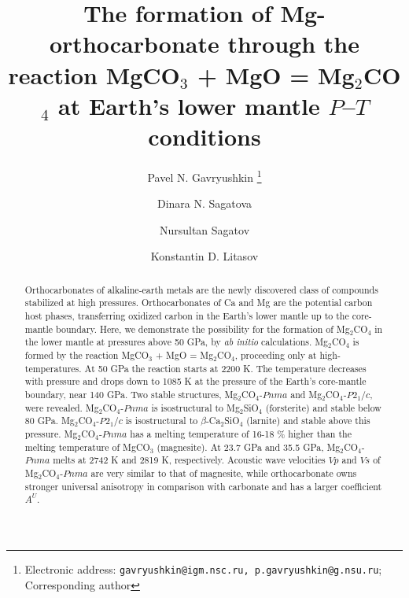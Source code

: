 \documentclass[a4paperm]{article}
\begin{document}

\title{The formation of Mg-orthocarbonate through the reaction MgCO$_3$ + MgO = Mg$_2$CO$_4$ at Earth's lower mantle $P$--$T$ conditions}


\author[1,2]{Pavel N. Gavryushkin
   \thanks{Electronic address: \texttt{gavryushkin@igm.nsc.ru, p.gavryushkin@g.nsu.ru}; Corresponding author}}     
\author[1,2]{Dinara N. Sagatova}
\author[1]{Nursultan Sagatov}
\author[3]{Konstantin D. Litasov}


\date{}
\maketitle


\begin{abstract}
Orthocarbonates of alkaline-earth metals are the newly discovered class of compounds stabilized at high pressures.
Orthocarbonates of Ca and Mg are the potential carbon host phases, transferring oxidized carbon in the Earth's lower mantle up to the core-mantle boundary.
Here, we demonstrate the possibility for the formation of Mg$_2$CO$_4$ in the lower mantle at pressures above 50 GPa, by {\it ab initio} calculations.
Mg$_2$CO$_4$ is formed by the reaction MgCO$_3$ + MgO = Mg$_2$CO$_4$, proceeding only at high-temperatures.
At 50 GPa the reaction starts at 2200 K.
The temperature decreases with pressure and drops down to 1085 K at the pressure of the Earth's core-mantle boundary, near 140 GPa.
Two stable structures, Mg$_2$CO$_4$-$Pnma$ and Mg$_2$CO$_4$-$P2_1/c$, were revealed. 
Mg$_2$CO$_4$-$Pnma$ is isostructural to Mg$_2$SiO$_4$ (forsterite) and stable below 80 GPa.
Mg$_2$CO$_4$-$P$2$_1$/$c$ is isostructural to $\beta$-Ca$_2$SiO$_4$ (larnite) and stable above this pressure.
Mg$_2$CO$_4$-$Pnma$ has a melting temperature of 16-18 \% higher  than the melting temperature of  MgCO$_3$ (magnesite).
At 23.7 GPa and 35.5 GPa, Mg$_2$CO$_4$-$Pnma$  melts at 2742 K and 2819 K, respectively.
Acoustic wave velocities $Vp$ and $Vs$ of Mg$_2$CO$_4$-$Pnma$ are very similar to that of magnesite, while orthocarbonate owns stronger universal anisotropy in comparison with carbonate and has a larger coefficient $A^U$.



\end{abstract}
\end{document}
